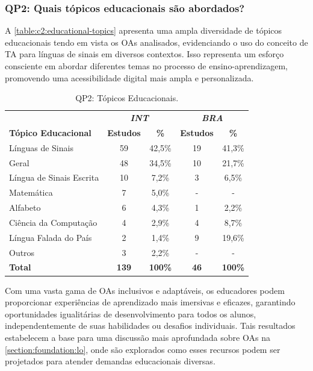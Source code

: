 \subsubsection{QP2: Quais tópicos educacionais são abordados?}

A \autoref{table:c2:educational-topics} apresenta uma ampla diversidade de tópicos educacionais tendo em vista os OAs analisados, evidenciando o uso do conceito de TA para línguas de sinais em diversos contextos. Isso representa um esforço consciente em abordar diferentes temas no processo de ensino-aprendizagem, promovendo uma acessibilidade digital mais ampla e personalizada. 

\begin{table}[htb]
\caption{QP2: Tópicos Educacionais.}
\label{table:c2:educational-topics}
\centering
\begin{tabular}{l|cc|cc} \hline
 & \multicolumn{2}{c|}{\textit{\textbf{INT}}} & \multicolumn{2}{c}{\textit{\textbf{BRA}}} \\ \cline{2-5} 
\textbf{Tópico Educacional} & \textbf{Estudos} & \textbf{\%} & \textbf{Estudos} & \textbf{\%} \\ \hline
Línguas de Sinais & 59 & 42,5\% & 19 & 41,3\% \\
Geral & 48 & 34,5\% & 10 & 21,7\% \\
Língua de Sinais Escrita & 10 & 7,2\% & 3 & 6,5\% \\
Matemática & 7 & 5,0\% & - & - \\
Alfabeto & 6 & 4,3\% & 1 & 2,2\% \\
Ciência da Computação & 4 & 2,9\% & 4 & 8,7\% \\
Língua Falada do País & 2 & 1,4\% & 9 & 19,6\% \\
Outros & 3 & 2,2\% & - & - \\ \hline
\textbf{Total} & \textbf{139} & \textbf{100\%} & \textbf{46} & \textbf{100\%} \\ \hline
\end{tabular}
\end{table}

Com uma vasta gama de OAs inclusivos e adaptáveis, os educadores podem proporcionar experiências de aprendizado mais imersivas e eficazes, garantindo oportunidades igualitárias de desenvolvimento para todos os alunos, independentemente de suas habilidades ou desafios individuais. Tais resultados estabelecem a base para uma discussão mais aprofundada sobre OAs na \autoref{section:foundation:lo}, onde são explorados como esses recursos podem ser projetados para atender demandas educacionais diversas.

